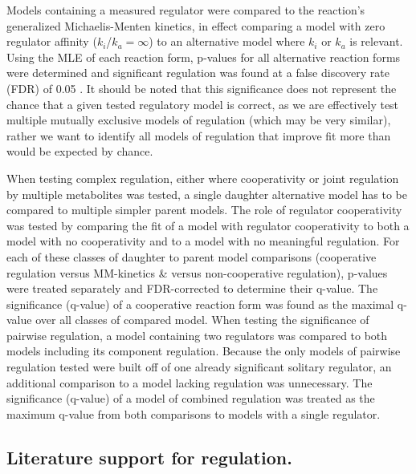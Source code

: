 \documentclass[12pt]{nature}\usepackage{graphicx, color}
\begin{document}
Models containing a measured regulator were compared to the reaction's generalized Michaelis-Menten kinetics, in effect comparing a model with zero regulator affinity ($k_{i}$/$k_{a} = \infty$) to an alternative model where $k_{i}$ or $k_{a}$ is relevant.  Using the MLE of each reaction form, p-values for all alternative reaction forms were determined and significant regulation was found at a false discovery rate (FDR) of 0.05 \cite{Storey:2003cj}.  It should be noted that this significance does not represent the chance that a given tested regulatory model is correct, as we are effectively test multiple mutually exclusive models of regulation (which may be very similar), rather we want to identify all models of regulation that improve fit more than would be expected by chance.

When testing complex regulation, either where cooperativity or joint regulation by multiple metabolites was tested, a single daughter alternative model has to be compared to multiple simpler parent models.  The role of regulator cooperativity was tested by comparing the fit of a model with regulator cooperativity to both a model with no cooperativity and to a model with no meaningful regulation.  For each of these classes of daughter to parent model comparisons (cooperative regulation versus MM-kinetics \& versus non-cooperative regulation), p-values were treated separately and FDR-corrected to determine their q-value.  The significance (q-value) of a cooperative reaction form was found as the maximal q-value over all classes of compared model.  When testing the significance of pairwise regulation, a model containing two regulators was compared to both models including its component regulation.  Because the only models of pairwise regulation tested were built off of one already significant solitary regulator, an additional comparison to a model lacking regulation was unnecessary.  The significance (q-value) of a model of combined regulation was treated as the maximum q-value from both comparisons to models with a single regulator.

\subsection{Literature support for regulation.}
\end{document}
